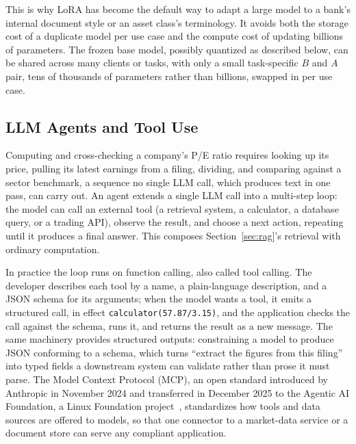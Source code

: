 \documentclass[../ai_in_finance]{subfiles}
\begin{document}
This is why LoRA has become the default way to adapt a large model to a bank's internal document style or an asset class's terminology. It avoids both the storage cost of a duplicate model per use case and the compute cost of updating billions of parameters. The frozen base model, possibly quantized as described below, can be shared across many clients or tasks, with only a small task-specific $B$ and $A$ pair, tens of thousands of parameters rather than billions, swapped in per use case.

\subsection{LLM Agents and Tool Use}
\label{sec:llm-agents}

Computing and cross-checking a company's P/E ratio requires looking up its price, pulling its latest earnings from a filing, dividing, and comparing against a sector benchmark, a sequence no single LLM call, which produces text in one pass, can carry out. An agent extends a single LLM call into a multi-step loop: the model can call an external tool (a retrieval system, a calculator, a database query, or a trading API), observe the result, and choose a next action, repeating until it produces a final answer. This composes Section~\ref{sec:rag}'s retrieval with ordinary computation.

In practice the loop runs on function calling, also called tool calling. The developer describes each tool by a name, a plain-language description, and a JSON schema for its arguments; when the model wants a tool, it emits a structured call, in effect \texttt{calculator(57.87/3.15)}, and the application checks the call against the schema, runs it, and returns the result as a new message. The same machinery provides structured outputs: constraining a model to produce JSON conforming to a schema, which turns ``extract the figures from this filing'' into typed fields a downstream system can validate rather than prose it must parse. The Model Context Protocol (MCP), an open standard introduced by Anthropic in November 2024 and transferred in December 2025 to the Agentic AI Foundation, a Linux Foundation project~\parencite{anthropic2024mcp,linuxfoundation2025aaif}, standardizes how tools and data sources are offered to models, so that one connector to a market-data service or a document store can serve any compliant application.
\end{document}
